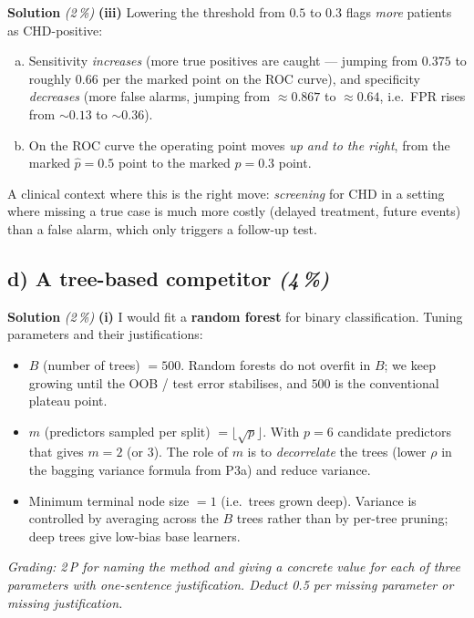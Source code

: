 \documentclass[11pt,a4paper]{article}
\newcommand{\subpoints}[1]{\textit{(#1\,\%)}}
\newcommand{\sol}{\noindent\textbf{Solution}}
\begin{document}
\medskip
\sol{} \subpoints{2} \textbf{(iii)} Lowering the threshold from $0.5$ to $0.3$ flags \emph{more} patients
as CHD-positive:
\begin{enumerate}[(a)]
  \item Sensitivity \emph{increases} (more true positives are caught --- jumping from $0.375$ to roughly
        $0.66$ per the marked point on the ROC curve), and specificity \emph{decreases} (more false
        alarms, jumping from $\approx 0.867$ to $\approx 0.64$, i.e.\ FPR rises from $\sim 0.13$ to $\sim 0.36$).
  \item On the ROC curve the operating point moves \emph{up and to the right}, from the marked $\hat p=0.5$
        point to the marked $\hat p=0.3$ point.
\end{enumerate}
A clinical context where this is the right move: \emph{screening} for CHD in a setting where missing a true
case is much more costly (delayed treatment, future events) than a false alarm, which only triggers a
follow-up test.

\subsection*{d) A tree-based competitor \subpoints{4}}

\sol{} \subpoints{2} \textbf{(i)} I would fit a \textbf{random forest} for binary classification.
Tuning parameters and their justifications:
\begin{itemize}
  \item $B$ (number of trees) $= 500$. Random forests do not overfit in $B$; we keep growing until
        the OOB / test error stabilises, and $500$ is the conventional plateau point.
  \item $m$ (predictors sampled per split) $= \lfloor\sqrt{p}\rfloor$. With $p=6$ candidate
        predictors that gives $m=2$ (or $3$). The role of $m$ is to \emph{decorrelate} the trees
        (lower $\rho$ in the bagging variance formula from P3a) and reduce variance.
  \item Minimum terminal node size $=1$ (i.e.\ trees grown deep). Variance is controlled by
        averaging across the $B$ trees rather than by per-tree pruning; deep trees give low-bias
        base learners.
\end{itemize}

\noindent\emph{Grading: 2\,P for naming the method and giving a concrete value for each of three
parameters with one-sentence justification. Deduct 0.5 per missing parameter or missing justification.}
\end{document}
